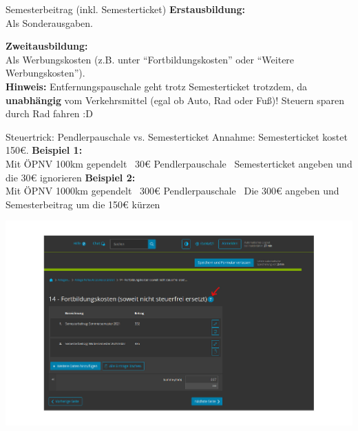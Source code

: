 \documentclass{beamer}
\begin{document}
			\begin{frame}{Semesterbeitrag (inkl. Semesterticket)}
				\textbf{Erstausbildung:}\\
				Als Sonderausgaben.\n
				
				\textbf{Zweitausbildung:}\\
				Als Werbungskosten (z.B. unter "`Fortbildungskosten"' oder "`Weitere Werbungskosten"').\n
				\hfill\\\pause
				\textbf{Hinweis:} Entfernungspauschale geht trotz Semesterticket trotzdem, da \textbf{unabhängig} vom Verkehrsmittel (egal ob Auto, Rad oder Fuß)! Steuern sparen durch Rad fahren :D
			\end{frame}
		
			\begin{frame}{Steuertrick: Pendlerpauschale vs. Semesterticket}
				Annahme: Semesterticket kostet 150€.\n
				\textbf{Beispiel 1:}\\
				Mit ÖPNV 100km gependelt \textrightarrow\ 30€ Pendlerpauschale \textrightarrow\ Semesterticket angeben und die 30€ ignorieren\n
				\textbf{Beispiel 2:}\\
				Mit ÖPNV 1000km gependelt \textrightarrow\ 300€ Pendlerpauschale \textrightarrow\ Die 300€ angeben und Semesterbeitrag um die 150€ kürzen
			\end{frame}
		
			\begin{frame}
				\begin{center}
					\vspace{-0.6cm}
					\hspace*{-0.91cm}
					\includegraphics[scale=0.24]{images/elster-fortbildungskosten-1}
				\end{center}
			\end{frame}
			
\end{document}
